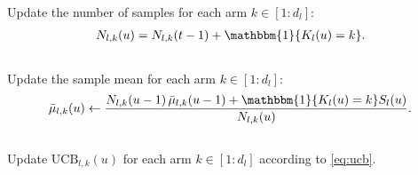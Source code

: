 \documentclass[12pt,draftcls, onecolumn]{IEEEtran}
\begin{document}
\begin{algorithm}[H]
\label{algo:2}
\caption{UCB for a Single-Queue Uniform Mesh Rate (Parameters $C,\delta$)}\label{algo:UCB_mesh}
\DontPrintSemicolon
{}
\end{algorithm}
\begin{algorithm}[H]
\label{alg:Update}
\SetAlgoLined
\DontPrintSemicolon
Update the number of samples for each arm $k \in [1:d_l]$:
\begin{align}
N_{l,k}(u) = N_{l,k}(t-1) + \mathbbm{1}\{K_l(u) = k\}. \nonumber
\end{align}\\

Update the sample mean for each arm $k \in [1:d_l]$:
\begin{align}
\bar{\mu}_{l,k}(u) \gets \frac{N_{l,k}(u-1)\,\bar{\mu}_{l,k}(u-1) + \mathbbm{1}\{K_l(u) = k\}S_{l}(u)}{N_{l,k}(u)}. \nonumber
\end{align}\\
Update $\text{UCB}_{l,k}(u)$ for each arm $k \in [1:d_l]$ according to \eqref{eq:ucb}.
\caption{Update Subroutine$(l,u)$}
\end{algorithm}
\end{document}
